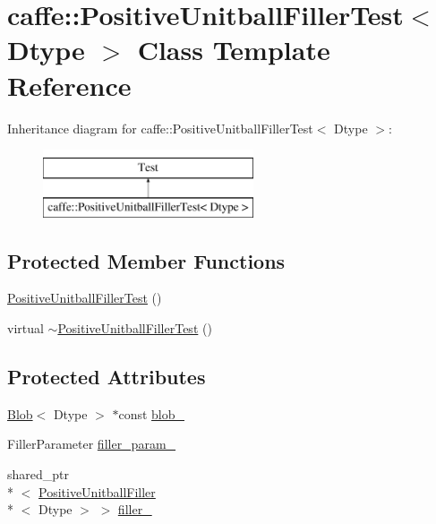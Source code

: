 \hypertarget{classcaffe_1_1_positive_unitball_filler_test}{\section{caffe\+:\+:Positive\+Unitball\+Filler\+Test$<$ Dtype $>$ Class Template Reference}
\label{classcaffe_1_1_positive_unitball_filler_test}
}
Inheritance diagram for caffe\+:\+:Positive\+Unitball\+Filler\+Test$<$ Dtype $>$\+:\begin{figure}[H]
\begin{center}
\leavevmode
\includegraphics[height=2.000000cm]{classcaffe_1_1_positive_unitball_filler_test}
\end{center}
\end{figure}
\subsection*{Protected Member Functions}
\begin{DoxyCompactItemize}
\item 
\hyperlink{classcaffe_1_1_positive_unitball_filler_test_a8f9c67a1e5aa19dbb4a293c7b6207be6}{Positive\+Unitball\+Filler\+Test} ()
\item 
virtual \hyperlink{classcaffe_1_1_positive_unitball_filler_test_ae3231191b016d7eaf5f5ffced625e92a}{$\sim$\+Positive\+Unitball\+Filler\+Test} ()
\end{DoxyCompactItemize}
\subsection*{Protected Attributes}
\begin{DoxyCompactItemize}
\item 
\hyperlink{classcaffe_1_1_blob}{Blob}$<$ Dtype $>$ $\ast$const \hyperlink{classcaffe_1_1_positive_unitball_filler_test_af19629fd3bf030416e99fb99560cc66f}{blob\+\_\+}
\item 
Filler\+Parameter \hyperlink{classcaffe_1_1_positive_unitball_filler_test_ab669b2aa9520fc63000ce297306376b5}{filler\+\_\+param\+\_\+}
\item 
shared\+\_\+ptr\\*
$<$ \hyperlink{classcaffe_1_1_positive_unitball_filler}{Positive\+Unitball\+Filler}\\*
$<$ Dtype $>$ $>$ \hyperlink{classcaffe_1_1_positive_unitball_filler_test_ad3ebaf3b06c5ec22019b0e29c50b1dd5}{filler\+\_\+}
\end{DoxyCompactItemize}


